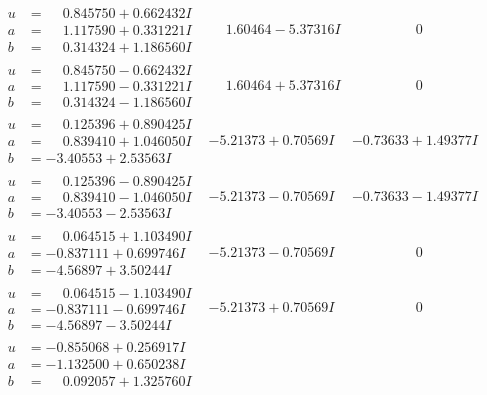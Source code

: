 \documentclass[1p]{elsarticle_modified}
\theoremstyle{definition}
\begin{document}
$$\begin{array}{c|c|c}
\begin{aligned}
u &= \phantom{-}0.845750 + 0.662432 I \\
a &= \phantom{-}1.117590 + 0.331221 I \\
b &= \phantom{-}0.314324 + 1.186560 I\end{aligned}
 & \phantom{-}1.60464 - 5.37316 I & \phantom{-0.000000 } 0 \\ \hline\begin{aligned}
u &= \phantom{-}0.845750 - 0.662432 I \\
a &= \phantom{-}1.117590 - 0.331221 I \\
b &= \phantom{-}0.314324 - 1.186560 I\end{aligned}
 & \phantom{-}1.60464 + 5.37316 I & \phantom{-0.000000 } 0 \\ \hline\begin{aligned}
u &= \phantom{-}0.125396 + 0.890425 I \\
a &= \phantom{-}0.839410 + 1.046050 I \\
b &= -3.40553 + 2.53563 I\end{aligned}
 & -5.21373 + 0.70569 I & -0.73633 + 1.49377 I \\ \hline\begin{aligned}
u &= \phantom{-}0.125396 - 0.890425 I \\
a &= \phantom{-}0.839410 - 1.046050 I \\
b &= -3.40553 - 2.53563 I\end{aligned}
 & -5.21373 - 0.70569 I & -0.73633 - 1.49377 I \\ \hline\begin{aligned}
u &= \phantom{-}0.064515 + 1.103490 I \\
a &= -0.837111 + 0.699746 I \\
b &= -4.56897 + 3.50244 I\end{aligned}
 & -5.21373 - 0.70569 I & \phantom{-0.000000 } 0 \\ \hline\begin{aligned}
u &= \phantom{-}0.064515 - 1.103490 I \\
a &= -0.837111 - 0.699746 I \\
b &= -4.56897 - 3.50244 I\end{aligned}
 & -5.21373 + 0.70569 I & \phantom{-0.000000 } 0 \\ \hline\begin{aligned}
u &= -0.855068 + 0.256917 I \\
a &= -1.132500 + 0.650238 I \\
b &= \phantom{-}0.092057 + 1.325760 I\end{aligned}

\end{array}$$
\end{document}
